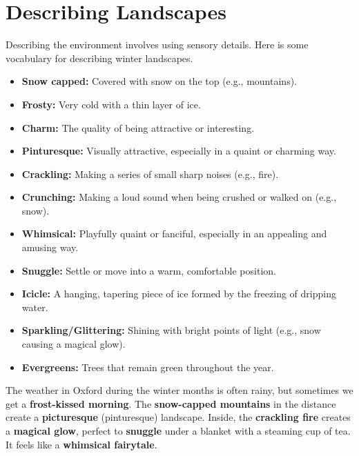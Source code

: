 \section{Describing Landscapes}

Describing the environment involves using sensory details. Here is some vocabulary for describing winter landscapes.

\begin{vocabbox}[title=Winter and Nature Vocabulary]
\begin{itemize}
    \item \textbf{Snow capped:} Covered with snow on the top (e.g., mountains).
    \item \textbf{Frosty:} Very cold with a thin layer of ice.
    \item \textbf{Charm:} The quality of being attractive or interesting.
    \item \textbf{Pinturesque:} Visually attractive, especially in a quaint or charming way.
    \item \textbf{Crackling:} Making a series of small sharp noises (e.g., fire).
    \item \textbf{Crunching:} Making a loud sound when being crushed or walked on (e.g., snow).
    \item \textbf{Whimsical:} Playfully quaint or fanciful, especially in an appealing and amusing way.
    \item \textbf{Snuggle:} Settle or move into a warm, comfortable position.
    \item \textbf{Icicle:} A hanging, tapering piece of ice formed by the freezing of dripping water.
    \item \textbf{Sparkling/Glittering:} Shining with bright points of light (e.g., snow causing a magical glow).
    \item \textbf{Evergreens:} Trees that remain green throughout the year.
\end{itemize}
\end{vocabbox}

\begin{examplebox}[title=Example Description]
The weather in Oxford during the winter months is often rainy, but sometimes we get a \textbf{frost-kissed morning}. The \textbf{snow-capped mountains} in the distance create a \textbf{picturesque} (pinturesque) landscape. Inside, the \textbf{crackling fire} creates a \textbf{magical glow}, perfect to \textbf{snuggle} under a blanket with a steaming cup of tea. It feels like a \textbf{whimsical fairytale}.
\end{examplebox}

